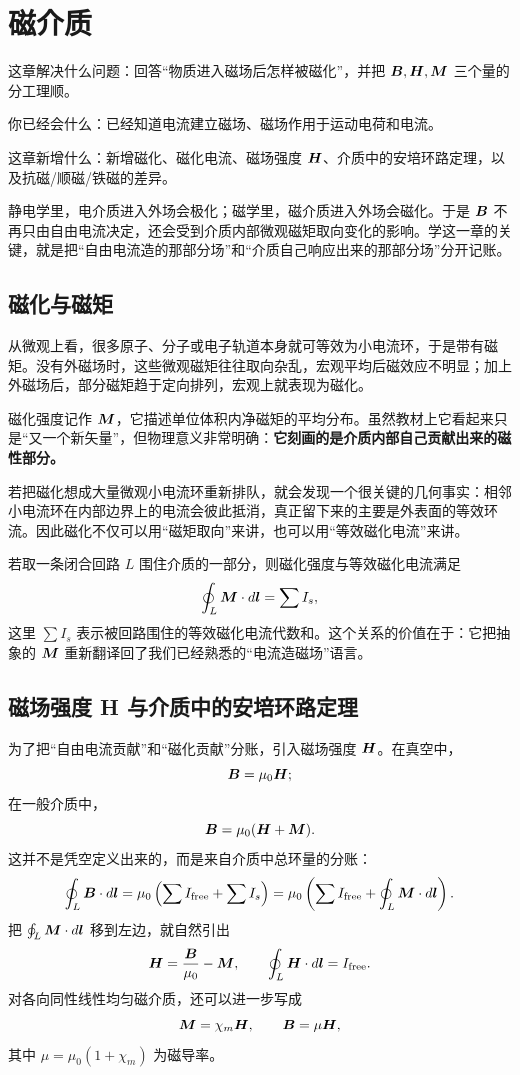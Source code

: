 \documentclass[lang=cn,11pt]{elegantbook}
\newcommand{\bridge}[1]{\begin{note}#1\end{note}}
\newcommand{\chapterroadmap}[3]{%
\begin{introduction}
  \item {\heiti 这章解决什么问题：}#1
  \item {\heiti 你已经会什么：}#2
  \item {\heiti 这章新增什么：}#3
\end{introduction}}
\begin{document}
\chapter{磁介质}

\chapterroadmap
{回答“物质进入磁场后怎样被磁化”，并把 \(\vb*{B},\vb*{H},\vb*{M}\) 三个量的分工理顺。}
{已经知道电流建立磁场、磁场作用于运动电荷和电流。}
{新增磁化、磁化电流、磁场强度 \(\vb*{H}\)、介质中的安培环路定理，以及抗磁/顺磁/铁磁的差异。}

\bridge{静电学里，电介质进入外场会极化；磁学里，磁介质进入外场会磁化。于是 \(\vb*{B}\) 不再只由自由电流决定，还会受到介质内部微观磁矩取向变化的影响。学这一章的关键，就是把“自由电流造的那部分场”和“介质自己响应出来的那部分场”分开记账。}

\section{磁化与磁矩}

从微观上看，很多原子、分子或电子轨道本身就可等效为小电流环，于是带有磁矩。没有外磁场时，这些微观磁矩往往取向杂乱，宏观平均后磁效应不明显；加上外磁场后，部分磁矩趋于定向排列，宏观上就表现为磁化。

磁化强度记作 \(\vb*{M}\)，它描述单位体积内净磁矩的平均分布。虽然教材上它看起来只是“又一个新矢量”，但物理意义非常明确：\textbf{它刻画的是介质内部自己贡献出来的磁性部分。}

\bridge{若把磁化想成大量微观小电流环重新排队，就会发现一个很关键的几何事实：相邻小电流环在内部边界上的电流会彼此抵消，真正留下来的主要是外表面的等效环流。因此磁化不仅可以用“磁矩取向”来讲，也可以用“等效磁化电流”来讲。}

若取一条闭合回路 \(L\) 围住介质的一部分，则磁化强度与等效磁化电流满足
\[
\oint_L \vb*{M}\cdot d\vb*{l}=\sum I_s,
\]
这里 \(\sum I_s\) 表示被回路围住的等效磁化电流代数和。这个关系的价值在于：它把抽象的 \(\vb*{M}\) 重新翻译回了我们已经熟悉的“电流造磁场”语言。

\section{磁场强度 H 与介质中的安培环路定理}

为了把“自由电流贡献”和“磁化贡献”分账，引入磁场强度 \(\vb*{H}\)。在真空中，
\[
\vb*{B}=\mu_0\vb*{H};
\]
在一般介质中，
\[
\vb*{B}=\mu_0(\vb*{H}+\vb*{M}).
\]
这并不是凭空定义出来的，而是来自介质中总环量的分账：
\[
\oint_L \vb*{B}\cdot d\vb*{l}
=\mu_0\left(\sum I_{\mathrm{free}}+\sum I_s\right)
=\mu_0\left(\sum I_{\mathrm{free}}+\oint_L \vb*{M}\cdot d\vb*{l}\right).
\]
把 \(\oint_L \vb*{M}\cdot d\vb*{l}\) 移到左边，就自然引出
\[
\vb*{H}=\frac{\vb*{B}}{\mu_0}-\vb*{M},
\qquad
\oint_L \vb*{H}\cdot d\vb*{l}=I_{\mathrm{free}}.
\]
对各向同性线性均匀磁介质，还可以进一步写成
\[
\vb*{M}=\chi_m \vb*{H},
\qquad
\vb*{B}=\mu\vb*{H},
\]
其中 \(\mu=\mu_0(1+\chi_m)\) 为磁导率。
\end{document}
